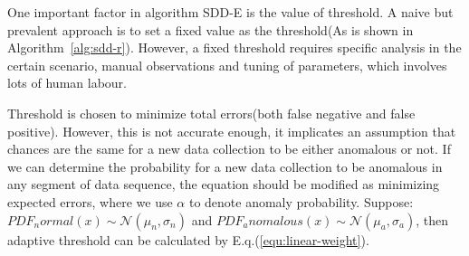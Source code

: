 \documentclass{article}
\begin{document}
			One important factor in algorithm SDD-E is the value of threshold.
			A naive but prevalent approach is to set a fixed value as the threshold(As is shown in Algorithm~\ref{alg:sdd-r}).
			However, a fixed threshold requires specific analysis in the certain scenario, manual observations and tuning of parameters, which involves lots of human labour.
			
	
			Threshold is chosen to minimize total errors(both false negative and false positive).
			However, this is not accurate enough, it implicates an assumption that chances are the same for a new data collection to be either anomalous or not. If we can determine the probability for a new data collection to be anomalous in any segment of data sequence, the equation should be modified as minimizing expected errors, where we use $\alpha$ to denote anomaly probability.
			Suppose: $PDF_normal(x) \sim \mathcal{N}(\mu_n, \sigma_n)$ and $PDF_anomalous(x) \sim \mathcal{N}(\mu_a, \sigma_a)$, then adaptive threshold can be calculated by E.q.(\ref{equ:linear-weight}).
	
\end{document}
